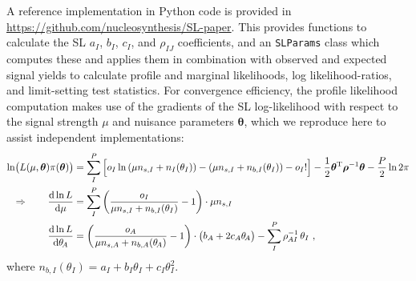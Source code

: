 \documentclass[11pt]{article}
\begin{document}
A reference implementation in Python code is provided in
\url{https://github.com/nucleosynthesis/SL-paper}.  This provides functions to
calculate the SL $a_I$, $b_I$, $c_I$, and $\rho_{IJ}$ coefficients, and an
\texttt{SLParams} class which computes these and applies them in combination
with observed and expected signal yields to calculate profile and marginal
likelihoods, log likelihood-ratios, and limit-setting test statistics. For
convergence efficiency, the profile likelihood computation makes use of the
gradients of the SL log-likelihood with respect to the signal strength $\mu$ and
nuisance parameters $\bm{\theta}$, which we reproduce here to assist independent
implementations:
%
\begin{align}
  \ln\! \big( L(\mu,\bm{\theta} )\pi(\bm{\theta}) \big) &=
  \sum_I^P \Big[ o_{I} \ln \left(\mu n_{s,I} + n_{I}(\theta_{I}) \right) - \left( \mu n_{s,I} + n_{b,I}(\theta_{I}) \right) - o_{I}! \Big]
  - \frac{1}{2} \bm{\theta}^\mathrm{T} \bm{\rho}^{-1} \bm{\theta} - \frac{P}{2} \ln 2\pi \\
  \Rightarrow \qquad
  \frac{\mathrm{d}\ln L}{\mathrm{d}\mu} &= \sum_I^P \left( \frac{o_I}{\mu n_{s,I} + n_{b,I}(\theta_{I})} - 1 \right) \cdot \mu n_{s,I} \\
  \frac{\mathrm{d}\ln L}{\mathrm{d}\theta_{\!A}} &= \left( \frac{o_A}{\mu n_{s,A} + n_{b,A}(\theta_{\!A}) } - 1 \right) \cdot \big( b_A + 2 c_A \theta_{\!A} \big) - \sum_I^P \rho_{\mspace{-1mu}AI}^{-1} \, \theta_I ~,
\label{eq:SL_LHC}
\end{align}
%
where $n_{b,I}(\theta_{I}) = a_{I} + b_{I}\theta_{I} + c_{I}\theta_{I}^{2}$.





\end{document}
